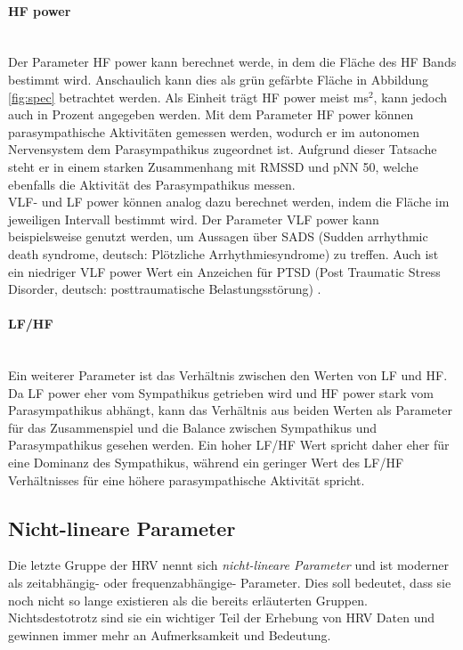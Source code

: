 \paragraph{HF power}\mbox{} \\
Der Parameter \acs{HF} power kann berechnet werde, in dem die Fläche des HF Bands bestimmt wird. Anschaulich kann dies als grün gefärbte Fläche in Abbildung \ref{fig:spec} betrachtet werden. Als Einheit trägt \acs{HF} power meist ms$^{2}$, kann jedoch auch in Prozent angegeben werden. 
Mit dem Parameter \acs{HF} power können parasympathische Aktivitäten gemessen werden, wodurch er im autonomen Nervensystem dem Parasympathikus zugeordnet ist. Aufgrund dieser Tatsache steht er in einem starken Zusammenhang mit \acs{RMSSD} und pNN 50, welche ebenfalls die Aktivität des Parasympathikus messen. \\
\acs{VLF}- und \acs{LF} power können analog dazu berechnet werden, indem die Fläche im jeweiligen Intervall bestimmt wird. Der Parameter \acs{VLF} power kann beispielsweise genutzt werden, um Aussagen über \acs{SADS} (Sudden arrhythmic death syndrome, deutsch: Plötzliche Arrhythmiesyndrome) zu treffen. Auch ist ein niedriger \acs{VLF} power Wert ein Anzeichen für \acs{PTSD} (Post Traumatic Stress Disorder, deutsch: posttraumatische Belastungsstörung) . \cite[S.5]{med}\\


\paragraph{LF/HF}\mbox{} \\
Ein weiterer Parameter ist das Verhältnis zwischen den Werten von \acs{LF} und \acs{HF}. Da \acs{LF} power eher vom Sympathikus getrieben wird und \acs{HF} power stark vom Parasympathikus abhängt, kann das Verhältnis aus beiden Werten als Parameter für das Zusammenspiel und die Balance zwischen Sympathikus und Parasympathikus gesehen werden. Ein hoher \acs{LF}/\acs{HF} Wert spricht daher eher für eine Dominanz des Sympathikus, während ein geringer Wert des \acs{LF}/\acs{HF} Verhältnisses für eine höhere parasympathische Aktivität spricht. \cite[S.5]{med} 

\subsection{Nicht-lineare Parameter}

Die letzte Gruppe der \acs{HRV} nennt sich \textit{nicht-lineare Parameter} und ist \glqq moderner\grqq{} als zeitabhängig- oder frequenzabhängige- Parameter. Dies soll bedeutet, dass sie noch nicht so lange existieren als die bereits erläuterten Gruppen. Nichtsdestotrotz sind sie ein wichtiger Teil der Erhebung von \acs{HRV} Daten und gewinnen immer mehr an Aufmerksamkeit und Bedeutung.\\

